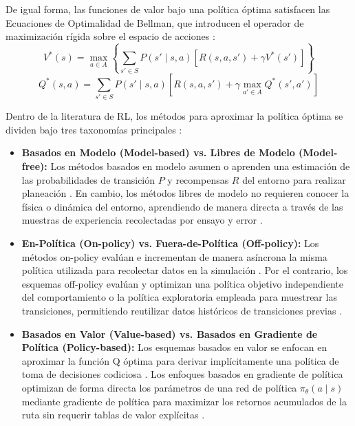 De igual forma, las funciones de valor bajo una política óptima satisfacen las Ecuaciones de Optimalidad de Bellman, que introducen el operador de maximización rígida sobre el espacio de acciones \citep{shakya2023reinforcement}:
\begin{equation}
    V^*(s) = \max_{a \in A} \left\{ \sum_{s' \in S} P(s' \mid s, a) \left[ R(s, a, s') + \gamma V^*(s') \right] \right\}
\end{equation}
\begin{equation}
    Q^*(s, a) = \sum_{s' \in S} P(s' \mid s, a) \left[ R(s, a, s') + \gamma \max_{a' \in A} Q^*(s', a') \right]
\end{equation}

Dentro de la literatura de RL, los métodos para aproximar la política óptima se dividen bajo tres taxonomías principales \citep{shakya2023reinforcement, murphy2025reinforcement}:
\begin{itemize}
    \item \textbf{Basados en Modelo (Model-based) vs. Libres de Modelo (Model-free):} Los métodos basados en modelo asumen o aprenden una estimación de las probabilidades de transición $P$ y recompensas $R$ del entorno para realizar planeación \citep{shakya2023reinforcement}. En cambio, los métodos libres de modelo no requieren conocer la física o dinámica del entorno, aprendiendo de manera directa a través de las muestras de experiencia recolectadas por ensayo y error \citep{shakya2023reinforcement}.
    \item \textbf{En-Política (On-policy) vs. Fuera-de-Política (Off-policy):} Los métodos on-policy evalúan e incrementan de manera asíncrona la misma política utilizada para recolectar datos en la simulación \citep{murphy2025reinforcement}. Por el contrario, los esquemas off-policy evalúan y optimizan una política objetivo independiente del comportamiento o la política exploratoria empleada para muestrear las transiciones, permitiendo reutilizar datos históricos de transiciones previas \citep{shakya2023reinforcement}.
    \item \textbf{Basados en Valor (Value-based) vs. Basados en Gradiente de Política (Policy-based):} Los esquemas basados en valor se enfocan en aproximar la función Q óptima para derivar implícitamente una política de toma de decisiones codiciosa \citep{murphy2025reinforcement}. Los enfoques basados en gradiente de política optimizan de forma directa los parámetros de una red de política $\pi_\theta(a \mid s)$ mediante gradiente de política para maximizar los retornos acumulados de la ruta sin requerir tablas de valor explícitas \citep{shakya2023reinforcement}.
\end{itemize}

